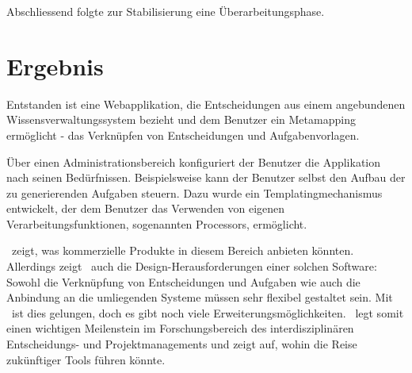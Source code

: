 	Abschliessend folgte zur Stabilisierung eine Überarbeitungsphase.


	\section{Ergebnis}

	Entstanden ist eine Webapplikation, die Entscheidungen aus einem angebundenen Wissensverwaltungssystem bezieht
	und dem Benutzer ein Metamapping ermöglicht - das Verknüpfen von Entscheidungen und Aufgabenvorlagen.

	Über einen  Administrationsbereich konfiguriert der Benutzer die Applikation nach seinen Bedürfnissen.
	Beispielsweise kann der Benutzer selbst den Aufbau der zu generierenden Aufgaben steuern. Dazu wurde ein Templatingmechanismus entwickelt,
	der dem Benutzer das Verwenden von eigenen Verarbeitungsfunktionen, sogenannten Processors, ermöglicht.

	\eeppi\ zeigt, was kommerzielle Produkte in diesem Bereich anbieten könnten.
	Allerdings zeigt \eeppi\ auch die Design-Herausforderungen einer solchen Software:
	Sowohl die Verknüpfung von Entscheidungen und Aufgaben wie auch die Anbindung an die umliegenden Systeme müssen sehr flexibel gestaltet sein.
	Mit \eeppi\ ist dies gelungen, doch es gibt noch viele Erweiterungsmöglichkeiten.
	\eeppi\ legt somit einen wichtigen Meilenstein im Forschungsbereich des interdisziplinären Entscheidungs- und Projektmanagements und
	zeigt auf, wohin die Reise zukünftiger Tools führen könnte.
